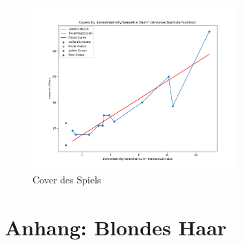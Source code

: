 \documentclass[german,a4paper,12pt,smallheadings,headsepline, titlepage, liststotoc, idextotoc,bibtoctoc,blibliography = totocnumbered]{scrartcl}
\begin{document}
\begin{figure}
	\centering
	\includegraphics[width=0.7\textwidth]{fig64/g12_denseIntensitynorm2.png}
	\caption[]{Cover des Spiels}
	\label{img:cover}
\end{figure}


\section{Anhang: Blondes Haar}
\end{document}

